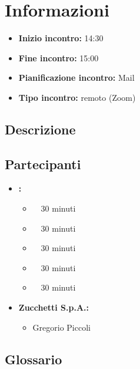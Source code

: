 \section{Informazioni}
\begin{itemize}
	\item \textbf{Inizio incontro:} 14:30
	\item \textbf{Fine incontro:} 15:00
	\item \textbf{Pianificazione incontro:} Mail
	\item \textbf{Tipo incontro:} remoto (Zoom)
\end{itemize}

\subsection{Descrizione}
\DocDescription

\subsection{Partecipanti}

\begin{itemize}
	\item \textbf{\GroupName:}
	\begin{itemize}
		\item \tommaso \ \rightarrow\ 30 minuti
		\item \riccardo \ \rightarrow\ 30 minuti
		\item \raul \ \rightarrow\ 30 minuti 
		\item \martina \ \rightarrow\ 30 minuti 
		\item \sebastiano \ \rightarrow\ 30  minuti 
	\end{itemize}
	\item \textbf{Zucchetti S.p.A.:}
    \begin{itemize}
        \item Gregorio Piccoli
    \end{itemize}
\end{itemize}

\subsection{Glossario}
\GlossarioIntroduzioneVE

\clearpage
